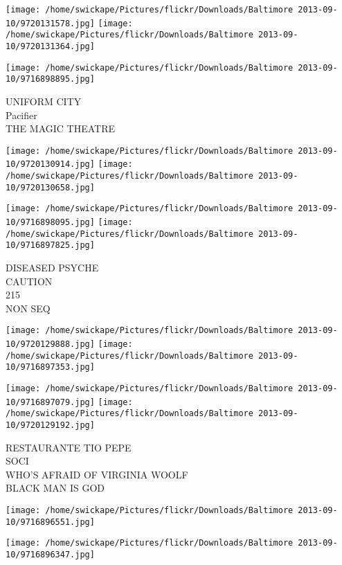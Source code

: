 \documentclass[10pt,letterpaper]{article}
\begin{document}
\texttt{[image: /home/swickape/Pictures/flickr/Downloads/Baltimore 2013-09-10/9720131578.jpg]}
\texttt{[image: /home/swickape/Pictures/flickr/Downloads/Baltimore 2013-09-10/9720131364.jpg]}

\vspace{0.25in}
\texttt{[image: /home/swickape/Pictures/flickr/Downloads/Baltimore 2013-09-10/9716898895.jpg]}

UNIFORM CITY\\
Pacifier\\
THE MAGIC THEATRE\\
\pagebreak

\texttt{[image: /home/swickape/Pictures/flickr/Downloads/Baltimore 2013-09-10/9720130914.jpg]}
\texttt{[image: /home/swickape/Pictures/flickr/Downloads/Baltimore 2013-09-10/9720130658.jpg]}

\texttt{[image: /home/swickape/Pictures/flickr/Downloads/Baltimore 2013-09-10/9716898095.jpg]}
\texttt{[image: /home/swickape/Pictures/flickr/Downloads/Baltimore 2013-09-10/9716897825.jpg]}

DISEASED PSYCHE\\
CAUTION\\
215\\
NON SEQ\\
\pagebreak

\texttt{[image: /home/swickape/Pictures/flickr/Downloads/Baltimore 2013-09-10/9720129888.jpg]}
\texttt{[image: /home/swickape/Pictures/flickr/Downloads/Baltimore 2013-09-10/9716897353.jpg]}

\texttt{[image: /home/swickape/Pictures/flickr/Downloads/Baltimore 2013-09-10/9716897079.jpg]}
\texttt{[image: /home/swickape/Pictures/flickr/Downloads/Baltimore 2013-09-10/9720129192.jpg]}

RESTAURANTE TIO PEPE\\
SOCI\\
WHO'S AFRAID OF VIRGINIA WOOLF\\
BLACK MAN IS GOD\\
\pagebreak

\texttt{[image: /home/swickape/Pictures/flickr/Downloads/Baltimore 2013-09-10/9716896551.jpg]}

\vspace{0.25in}
\texttt{[image: /home/swickape/Pictures/flickr/Downloads/Baltimore 2013-09-10/9716896347.jpg]}
\end{document}
